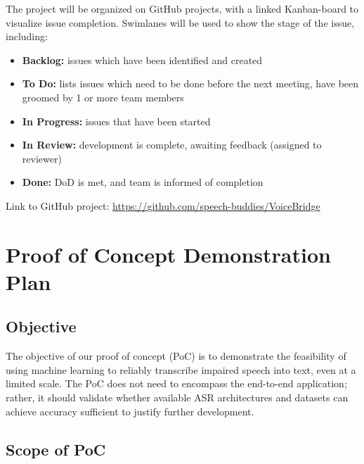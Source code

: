 \documentclass{article}
\begin{document}
The project will be organized on GitHub projects, with a linked Kanban-board to visualize issue completion. Swimlanes will be used to show the stage of the issue, including:

\begin{itemize}
    \item \textbf{Backlog:} issues which have been identified and created
    \item \textbf{To Do:} lists issues which need to be done before the next meeting, have been groomed by 1 or more team members
    \item \textbf{In Progress:} issues that have been started
    \item \textbf{In Review:} development is complete, awaiting feedback (assigned to reviewer)
    \item \textbf{Done:} DoD is met, and team is informed of completion
\end{itemize}

Link to GitHub project: \url{https://github.com/speech-buddies/VoiceBridge}

\section{Proof of Concept Demonstration Plan}


\subsection{Objective}

The objective of our proof of concept (PoC) is to demonstrate the feasibility of using machine learning to reliably transcribe impaired speech into text, even at a limited scale. The PoC does not need to encompass the end-to-end application; rather, it should validate whether available ASR architectures and datasets can achieve accuracy sufficient to justify further development.

\subsection{Scope of PoC}
\end{document}
